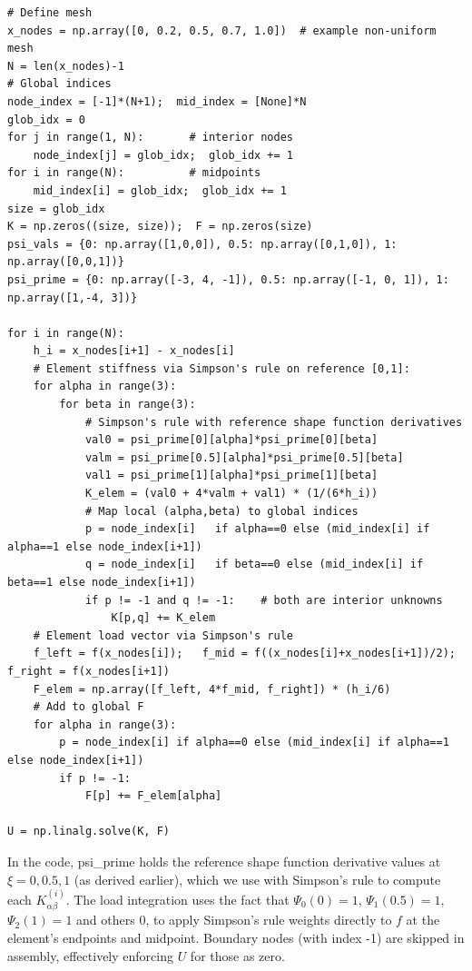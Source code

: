 \documentclass[a4paper,10pt]{article}
\begin{document}
\begin{verbatim}
# Define mesh
x_nodes = np.array([0, 0.2, 0.5, 0.7, 1.0])  # example non-uniform mesh
N = len(x_nodes)-1
# Global indices
node_index = [-1]*(N+1);  mid_index = [None]*N
glob_idx = 0
for j in range(1, N):       # interior nodes
    node_index[j] = glob_idx;  glob_idx += 1
for i in range(N):          # midpoints
    mid_index[i] = glob_idx;  glob_idx += 1
size = glob_idx
K = np.zeros((size, size));  F = np.zeros(size)
psi_vals = {0: np.array([1,0,0]), 0.5: np.array([0,1,0]), 1: np.array([0,0,1])}
psi_prime = {0: np.array([-3, 4, -1]), 0.5: np.array([-1, 0, 1]), 1: np.array([1,-4, 3])}

for i in range(N):
    h_i = x_nodes[i+1] - x_nodes[i]
    # Element stiffness via Simpson's rule on reference [0,1]:
    for alpha in range(3):
        for beta in range(3):
            # Simpson's rule with reference shape function derivatives
            val0 = psi_prime[0][alpha]*psi_prime[0][beta]
            valm = psi_prime[0.5][alpha]*psi_prime[0.5][beta]
            val1 = psi_prime[1][alpha]*psi_prime[1][beta]
            K_elem = (val0 + 4*valm + val1) * (1/(6*h_i))
            # Map local (alpha,beta) to global indices
            p = node_index[i]   if alpha==0 else (mid_index[i] if alpha==1 else node_index[i+1])
            q = node_index[i]   if beta==0 else (mid_index[i] if beta==1 else node_index[i+1])
            if p != -1 and q != -1:    # both are interior unknowns
                K[p,q] += K_elem
    # Element load vector via Simpson's rule
    f_left = f(x_nodes[i]);   f_mid = f((x_nodes[i]+x_nodes[i+1])/2);   f_right = f(x_nodes[i+1])
    F_elem = np.array([f_left, 4*f_mid, f_right]) * (h_i/6)
    # Add to global F
    for alpha in range(3):
        p = node_index[i] if alpha==0 else (mid_index[i] if alpha==1 else node_index[i+1])
        if p != -1:
            F[p] += F_elem[alpha]

U = np.linalg.solve(K, F)
\end{verbatim}

In the code, psi\_prime holds the reference shape function derivative values at $\xi=0,0.5,1$ (as derived earlier), which we use with Simpson's rule to compute each $K^{(i)}_{\alpha\beta}$. 
The load integration uses the fact that $\Psi_0(0)=1$, $\Psi_1(0.5)=1$, $\Psi_2(1)=1$ and others 0, to apply Simpson's rule weights directly to $f$ at the element's endpoints and midpoint. 
Boundary nodes (with index -1) are skipped in assembly, effectively enforcing $U$ for those as zero.
\end{document}
